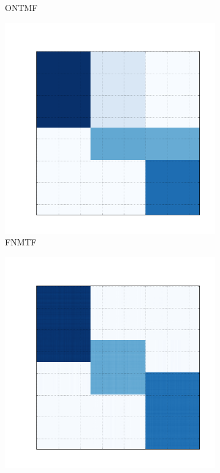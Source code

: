 \documentclass[10pt]{beamer}
\begin{document}
\begin{frame}
\begin{figure}[H]
\begin{subfigure}[b]{0.13\textwidth}
          \caption*{ONTMF}
      \end{subfigure}
      \begin{subfigure}[b]{0.13\textwidth}
          \includegraphics[width=\textwidth]{img/e-reconstruction-fnmtf.png}
          \caption*{FNMTF}
      \end{subfigure}
      \begin{subfigure}[b]{0.13\textwidth}
          \includegraphics[width=\textwidth]{img/e-reconstruction-ovnmtf.png}

\end{subfigure}
\end{figure}
\end{frame}
\end{document}
